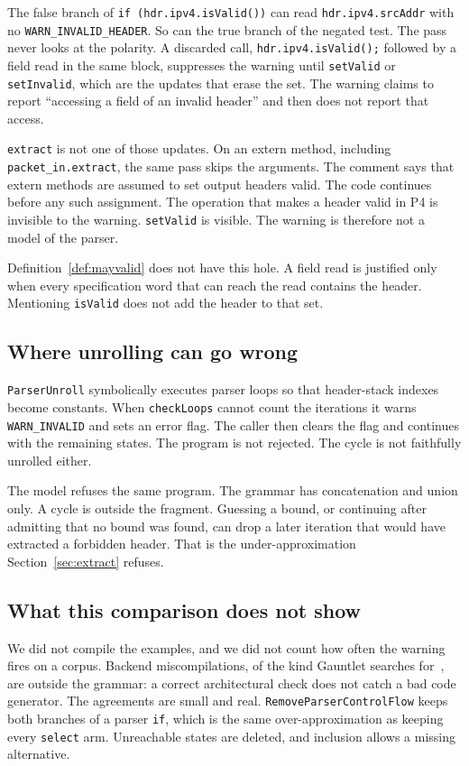 \documentclass[a4paper,UKenglish,cleveref,autoref]{lipics-v2021}
\begin{document}
The false branch of \texttt{if (hdr.ipv4.isValid())} can read \texttt{hdr.ipv4.srcAddr} with no \texttt{WARN\_INVALID\_HEADER}.
So can the true branch of the negated test.
The pass never looks at the polarity.
A discarded call, \texttt{hdr.ipv4.isValid();} followed by a field read in the same block, suppresses the warning until \texttt{setValid} or \texttt{setInvalid}, which are the updates that erase the set.
The warning claims to report ``accessing a field of an invalid header'' and then does not report that access.

\texttt{extract} is not one of those updates.
On an extern method, including \texttt{packet\_in.extract}, the same pass skips the arguments.
The comment says that extern methods are assumed to set output headers valid.
The code continues before any such assignment.
The operation that makes a header valid in P4 is invisible to the warning.
\texttt{setValid} is visible.
The warning is therefore not a model of the parser.

Definition~\ref{def:mayvalid} does not have this hole.
A field read is justified only when every specification word that can reach the read contains the header.
Mentioning \texttt{isValid} does not add the header to that set.

\subsection{Where unrolling can go wrong}

\texttt{ParserUnroll} symbolically executes parser loops so that header-stack indexes become constants.
When \texttt{checkLoops} cannot count the iterations it warns \texttt{WARN\_INVALID} and sets an error flag.
The caller then clears the flag and continues with the remaining states.
The program is not rejected.
The cycle is not faithfully unrolled either.

The model refuses the same program.
The grammar has concatenation and union only.
A cycle is outside the fragment.
Guessing a bound, or continuing after admitting that no bound was found, can drop a later iteration that would have extracted a forbidden header.
That is the under-approximation Section~\ref{sec:extract} refuses.

\subsection{What this comparison does not show}

We did not compile the examples, and we did not count how often the warning fires on a corpus.
Backend miscompilations, of the kind Gauntlet searches for~\cite{gauntlet}, are outside the grammar: a correct architectural check does not catch a bad code generator.
The agreements are small and real.
\texttt{RemoveParserControlFlow} keeps both branches of a parser \texttt{if}, which is the same over-approximation as keeping every \texttt{select} arm.
Unreachable states are deleted, and inclusion allows a missing alternative.
\end{document}
